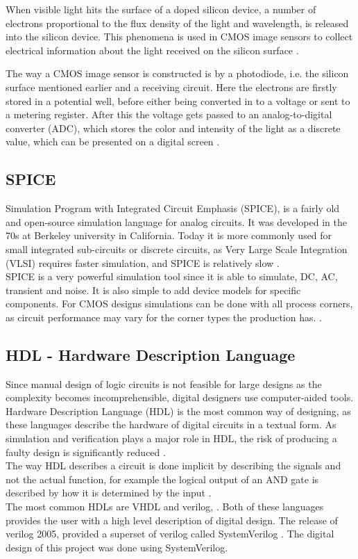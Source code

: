 When visible light hits the surface of a doped silicon device, a number of electrons proportional to the flux density of the light and wavelength, is released into the silicon device. 
This phenomena is used in CMOS image sensors to collect electrical information about the light received on the silicon surface \cite{turchetta_spring_davidson}.

The way a CMOS image sensor is constructed is by a photodiode, i.e. the silicon surface mentioned earlier and a receiving circuit. 
Here the electrons are firstly stored in a potential well, before either being converted in to a voltage or sent to a  metering register. 
After this the voltage gets passed to an analog-to-digital converter (ADC), which stores the color and intensity of the light as a discrete value, which can be presented on a digital screen \cite{turchetta_spring_davidson}.

\subsection{SPICE}
\label{spice}
Simulation Program with Integrated Circuit Emphasis (SPICE), is a fairly old and open-source simulation language for analog circuits. 
It was developed in the 70s at Berkeley university in California. 
Today it is more commonly used for small integrated sub-circuits or discrete circuits, as Very Large Scale Integration (VLSI) requires faster simulation, and SPICE is relatively slow \cite{nagel}.\\
SPICE is a very powerful simulation tool since it is able to simulate, DC, AC, transient and noise. 
It is also simple to add device models for specific components. 
For CMOS designs simulations can be done with all process corners, as circuit performance may vary for the corner types the production has. \cite{nagel}.

\subsection{HDL - Hardware Description Language}
\label{HDL}
Since manual design of logic circuits is not feasible for large designs as the complexity becomes incomprehensible, digital designers use computer-aided tools. 
Hardware Description Language (HDL) is the most common way of designing, as these languages describe the hardware of digital circuits in a textual form. 
As simulation and verification plays a major role in HDL, the risk of producing a faulty design is significantly reduced \cite{mano_ciletti_2013}.\\
The way HDL describes a circuit is done implicit by describing the signals and not the actual function, for example the logical output of an AND gate is described by how it is determined by the input \cite{mano_ciletti_2013}.\\
The most common HDLs are VHDL and verilog, \cite{arar_2017} \cite{steve_2019}. 
Both of these languages provides the user with a high level description of digital design. 
The release of verilog 2005, provided a superset of verilog called SystemVerilog \cite{digilent}. 
The digital design of this project was done using SystemVerilog.
